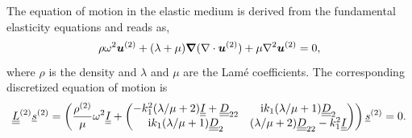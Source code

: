 The equation of motion in the elastic medium is derived from the fundamental elasticity equations \cite{achenbach2014} and reads as, 
    \begin{equation}
        \rho \omega^2 \boldsymbol u^{(2)} + (\lambda + \mu) \boldsymbol{\nabla}(\nabla \cdot \boldsymbol u^{(2)} ) + \mu\nabla^2 \boldsymbol u^{(2)} = 0,
    \label{eq:elastodynamic}
    \end{equation}
where $\rho$ is the density and $\lambda$ and $\mu$ are the Lam\'e coefficients.
The corresponding discretized equation of motion is
        \begin{equation}
             \underline{\underline{L}}^{(2)} \underline{s}^{(2)} =\left(\frac{\rho^{(2)}}{\mu} \omega^2 \underline{\underline{I}} +
            \begin{pmatrix}
                - k_1^2(\lambda / \mu + 2) \underline{\underline{I}} + \underline{\underline{D}}_{22}& \mathrm i  k_1 (\lambda / \mu + 1) \underline{\underline{D}}_2 \\
                \mathrm i  k_1 (\lambda/ \mu + 1) \underline{\underline{D}}_2 & (\lambda / \mu + 2)\underline{\underline{D}}_{22} - k_1^2 \underline{\underline{I}}
            \end{pmatrix} \right) \underline{s}^{(2)} = 0.
            \label{eq:elastodynamic_discrete}
        \end{equation}
    
